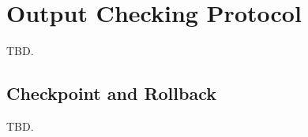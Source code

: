 \section{Output Checking Protocol} \label{sec:output}

TBD.

\subsection{Checkpoint and Rollback} \label{sec:checkpoint}

TBD.